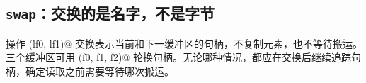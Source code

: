 \subsection*{\texttt{swap}：交换的是名字，不是字节}

操作 \co@swap(lf0, lf1)@ 交换表示当前和下一缓冲区的句柄，不复制元素，也不等待搬运。三个缓冲区可用 \co@rotate(f0, f1, f2)@ 轮换句柄。无论哪种情况，都应在交换后继续追踪句柄，确定读取之前需要等待哪次搬运。
